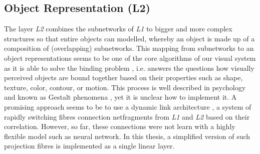 \subsection{Object Representation (L2)}
The layer \emph{L2} combines the subnetworks of \emph{L1} to bigger and more complex structures so that entire objects can modelled, whereby an object is made up of a composition of (overlapping) subnetworks.
This mapping from subnetworks to an object representations seems to be one of the core algorithms of our visual system as it is able to solve the binding problem , i.e. answers the questions how visually perceived objects are bound together based on their properties such as shape, texture, color, contour, or motion. This process is well described in psychology and known as Gestalt phenomena \cite{ellis_source_1938, kohler_gestalt_1992, wagemans_century_2012, hamlyn_psychology_2017}, yet it is unclear how to implement it.
A promising approach seems to be to use a dynamic link architecture , 
a system of rapidly switching fibres connection netfragments from \emph{L1} and \emph{L2} based on their correlation.
However, so far, these connections were not learn with a highly flexible model such as neural network.
In this thesis, a simplified version of such projection fibres is implemented as a single linear layer.

